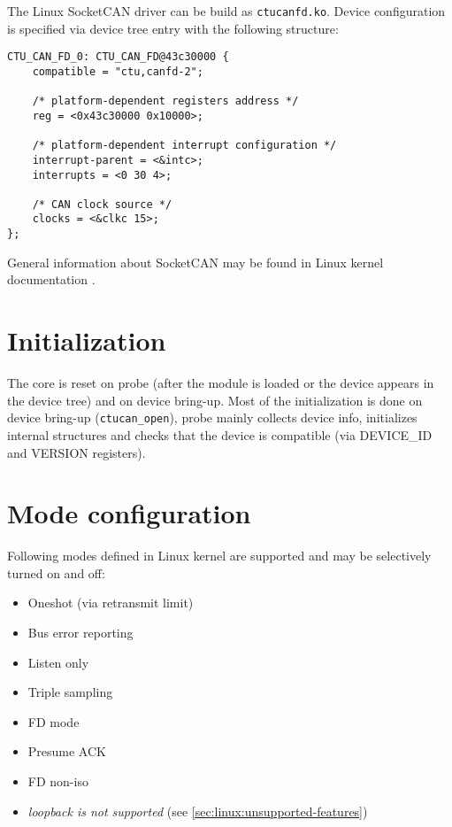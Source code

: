 
The Linux SocketCAN driver can be build as \verb|ctucanfd.ko|.
Device configuration is specified via device tree entry with the following
structure:

\begin{verbatim}
CTU_CAN_FD_0: CTU_CAN_FD@43c30000 {
    compatible = "ctu,canfd-2";

    /* platform-dependent registers address */
    reg = <0x43c30000 0x10000>;

    /* platform-dependent interrupt configuration */
    interrupt-parent = <&intc>;
    interrupts = <0 30 4>;

    /* CAN clock source */
    clocks = <&clkc 15>;
};
\end{verbatim}

General information about SocketCAN may be found in Linux kernel documentation
\cite{doc:socketcan}. %

\section{Initialization}

The core is reset on probe (after the module is loaded or the device appears in
the device tree) and on device bring-up. Most of the initialization is done on
device bring-up (\verb|ctucan_open|), probe mainly collects device info,
initializes internal structures and checks that the device is compatible (via
DEVICE\_ID and VERSION registers).


\section{Mode configuration}

Following modes defined in Linux kernel are supported and may be selectively
turned on and off:
\begin{itemize}
\item Oneshot (via retransmit limit)
\item Bus error reporting
\item Listen only
\item Triple sampling
\item FD mode
\item Presume ACK
\item FD non-iso
\item \textit{loopback is not supported} (see \ref{sec:linux:unsupported-features})
\end{itemize}


